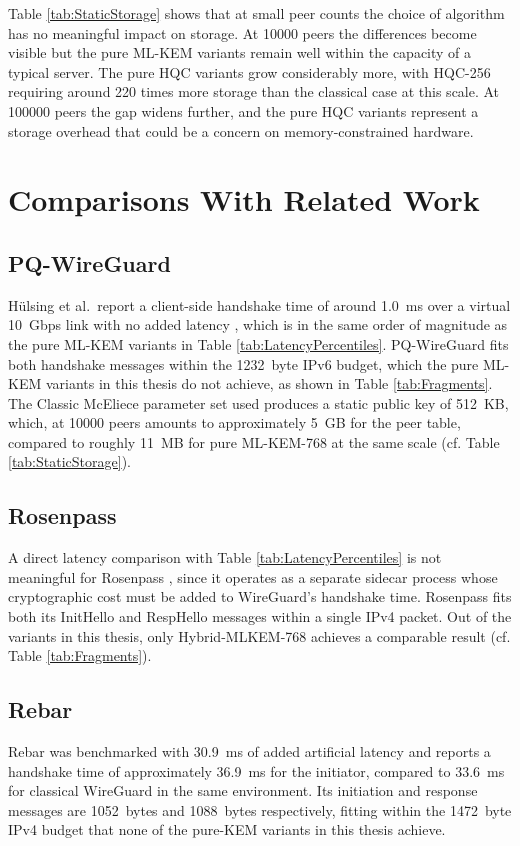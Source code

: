 Table \ref{tab:StaticStorage} shows that at small peer counts the choice of algorithm has no meaningful impact on storage. At \num{10000} peers the differences become visible but the pure ML-KEM variants remain well within the capacity of a typical server. The pure HQC variants grow considerably more, with HQC-256 requiring around 220 times more storage than the classical case at this scale. At \num{100000} peers the gap widens further, and the pure HQC variants represent a storage overhead that could be a concern on memory-constrained hardware. 


\section{Comparisons With Related Work}\label{sec:results-comparisons}

\subsection{PQ-WireGuard}
Hülsing et al.\ report a client-side handshake time of around \qty{1.0}{ms} over a virtual \qty{10}{Gbps} link with no added latency \cite{pqwg}, which is in the same order of magnitude as the pure ML-KEM variants in Table \ref{tab:LatencyPercentiles}. PQ-WireGuard fits both handshake messages within the \qty{1232}{byte} IPv6 budget, which the pure ML-KEM variants in this thesis do not achieve, as shown in Table \ref{tab:Fragments}. The Classic McEliece parameter set used produces a static public key of \qty{512}{KB}, which, at \num{10000} peers amounts to approximately \qty{5}{GB} for the peer table, compared to roughly \qty{11}{MB} for pure ML-KEM-768 at the same scale (cf. Table \ref{tab:StaticStorage}).

\subsection{Rosenpass}
A direct latency comparison with Table \ref{tab:LatencyPercentiles} is not meaningful for Rosenpass \cite{rosenpass}, since it operates as a separate sidecar process whose cryptographic cost must be added to WireGuard's handshake time. Rosenpass fits both its InitHello and RespHello messages within a single IPv4 packet. Out of the variants in this thesis, only Hybrid-MLKEM-768 achieves a comparable result (cf. Table \ref{tab:Fragments}).

\subsection{Rebar}
Rebar \cite{rebar} was benchmarked with \qty{30.9}{ms} of added artificial latency and reports a handshake time of approximately \qty{36.9}{ms} for the initiator, compared to \qty{33.6}{ms} for classical WireGuard in the same environment. Its initiation and response messages are \qty{1052}{bytes} and \qty{1088}{bytes} respectively, fitting within the \qty{1472}{byte} IPv4 budget that none of the pure-KEM variants in this thesis achieve.

